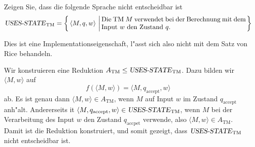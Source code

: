 Zeigen Sie, dass die folgende  Sprache nicht entscheidbar ist
\[
\text{\textsl{USES-STATE}}_{\text{TM}}=
\left\{
\,
\langle M,q,w\rangle \,\left|\,
\begin{minipage}{3truein}Die TM $M$ verwendet bei der Berechnung mit
dem Input $w$ den Zustand $q$.
\end{minipage}\right.
\right\}
\]

\begin{hinweis}
Dies ist eine Implementationseigenschaft, l"asst sich
also nicht mit dem Satz von Rice behandeln.
\end{hinweis}

\begin{loesung}
Wir konstruieren eine Reduktion
$A_{\text{TM}}\le \text{\textsl{USES-STATE}}_{\text{TM}}$.
Dazu bilden wir
$\langle M,w\rangle$
auf
\[
f(\langle M,w\rangle)=
\langle M,q_{\text{accept}},w\rangle
\]
ab. Es ist genau dann
$\langle M,w\rangle\in A_{\text{TM}}$, wenn $M$ auf Input $w$ im
Zustand $q_{\text{accept}}$ anh"alt. Andererseits it
$\langle M,q_{\text{accept}},w\rangle\in 
\text{\textsl{USES-STATE}}_{\text{TM}}$, wenn $M$ bei der Verarbeitung
des Input $w$ den Zustand $q_{\text{accpet}}$ verwende, also
$\langle M,w\rangle\in A_{\text{TM}}$. Damit ist die Reduktion
konstruiert, und somit gezeigt, dass
$\text{\textsl{USES-STATE}}_{\text{TM}}$ nicht entscheidbar ist.
\end{loesung}
